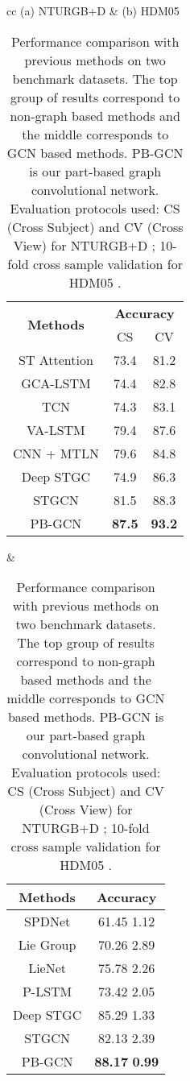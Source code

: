 \documentclass{bmvc2k}
\begin{document}
\begin{table}[t]
    \begin{center}
        \small
        \begin{tabular}{cc}
            (a) NTURGB+D & (b) HDM05 \\
            \begin{tabular}{ccc}
            \toprule
            \multirow{2}{*}{\textbf{Methods}} & \multicolumn{2}{c}{\textbf{Accuracy}} \\
            & CS & CV \\
            \midrule
            ST Attention \cite{song2017end} & 73.4 & 81.2 \\
            GCA-LSTM \cite{liu2017global} & 74.4 & 82.8 \\
            TCN \cite{kim2017interpretable} & 74.3 & 83.1 \\
            VA-LSTM \cite{zhang2017view} & 79.4 & 87.6 \\
            CNN + MTLN \cite{ke2017new} & 79.6 & 84.8 \\
            \midrule
            Deep STGC \cite{li2018spatio} & 74.9 & 86.3 \\
            STGCN \cite{yan2018spatial} & 81.5 & 88.3 \\
            \midrule
            PB-GCN & \textbf{87.5} & \textbf{93.2} \\
            \bottomrule
            \end{tabular}
            &
            \begin{tabular}{cc}
                \toprule
                \textbf{Methods} & \textbf{Accuracy} \\
                \midrule
                SPDNet \cite{huang2017riemannian} & 61.45  1.12 \\
                Lie Group \cite{vemulapalli2014human} & 70.26  2.89 \\
                LieNet \cite{huang2017deep} & 75.78  2.26 \\
                P-LSTM \cite{Shahroudy_2016_CVPR} & 73.42  2.05 \\
                \midrule
                Deep STGC \cite{li2018spatio} & 85.29  1.33 \\
                STGCN \cite{yan2018spatial} & 82.13  2.39 \\
                \midrule
                PB-GCN & \textbf{88.17}  \textbf{0.99} \\
                \bottomrule
            \end{tabular}
        \end{tabular}
    \end{center}
    \caption{\small{Performance comparison with previous methods on two benchmark datasets. The top group of results correspond to non-graph based methods and the middle corresponds to GCN based methods. PB-GCN is our part-based graph convolutional network. Evaluation protocols used: CS (Cross Subject) and CV (Cross View) for NTURGB+D \cite{Shahroudy_2016_CVPR}; 10-fold cross sample validation for HDM05 \cite{huang2017riemannian}.}}
    \label{tab:sota}
\end{table}
\end{document}
